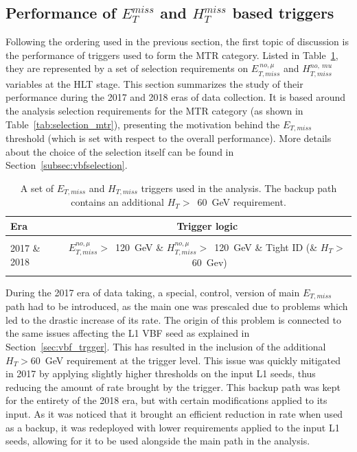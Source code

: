\subsection{Performance of $E_T^{miss}$ and $H_T^{miss}$ based triggers}
\label{subsec:mtr_triggers}
\hspace{10pt} Following the ordering used in the previous section, the first topic of discussion is the performance of triggers used to form the MTR category. Listed in Table~\ref{tab:metmht}, they are represented by a set of selection requirements on $E_{T,miss}^{~no,\mu}$ and $H_{T,miss}^{no,~mu}$ variables at the HLT stage. This section summarizes the study of their performance during the 2017 and 2018 eras of data collection. It is based around the analysis selection requirements for the MTR category (as shown in Table~\ref{tab:selection_mtr}), presenting the motivation behind the $E_{T,miss}$ threshold (which is set with respect to the overall performance). More details about the choice of the selection itself can be found in Section~\ref{subsec:vbfselection}.

\begin{table}[htbp]
\centering
\small
\begin{tabular}{l|c}
\hline\hline
Era & Trigger logic                                               \\ \hline
\multirow{3}{*}{2017 \& 2018} &\\
                      &$E_{T,miss}^{no,\mu}>$~120~GeV \& $H_{T,miss}^{no,\mu}>$~120~GeV \& Tight ID (\& $H_T>$~60~Gev)\\
                        &\\\hline
\hline\hline
\end{tabular}
\caption{A set of $E_{T,miss}$ and $H_{T,miss}$  triggers used in the analysis. The backup path contains an additional $H_T>$~60~GeV requirement.  \label{tab:metmht}}
\end{table}
\hspace{10pt} During the 2017 era of data taking, a special, control, version of main $E_{T,miss}$ path had to be introduced, as the main one was prescaled due to problems which led to the drastic increase of its rate. The origin of this problem is connected to the same issues affecting the L1 VBF seed as explained in Section~\ref{sec:vbf_trgger}. This has resulted in the inclusion of the additional $H_T>$60~GeV requirement at the trigger level. This issue was quickly mitigated in 2017 by applying slightly higher thresholds on the input L1 seeds, thus reducing the amount of rate brought by the trigger. This backup path was kept for the entirety of the 2018 era, but with certain modifications applied to its input. As it was noticed that it brought an efficient reduction in rate when used as a backup, it was redeployed with lower requirements applied to the input L1 seeds, allowing for it to be used alongside the main path in the analysis.

